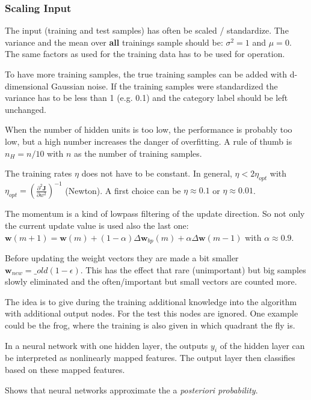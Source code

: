   \subsubsection{Scaling Input}
  The input (training and test samples) has often be scaled / standardize. The variance and the mean over \textbf{all} trainings sample should be: 
  $\sigma^2=1$ and $\mu=0$. The same factors as used for the training data has to be used for operation.
  
  
 
 To have more training samples, the true training samples can be added with d-dimensional Gaussian noise.
 If the training samples were standardized the variance has to be less than 1 (e.g. 0.1) and the category label should be left unchanged.
 
 When the number of hidden units is too low, the performance is probably too low, but a high number 
 increases the danger of overfitting. A rule of thumb is $n_H = n/10$ with $n$ as the number of training samples.
 
 The training rates $\eta$ does not have to be constant. In general,  $\eta < 2\eta_{opt}$ with $\eta_{opt}= \left( \frac{\partial^2\bm J}{\partial w^2} \right)^{-1}$ (Newton). 
 A first choice can be $\eta \approx 0.1$ or $\eta \approx 0.01$.
 
 The momentum is a kind of lowpass filtering of the update direction. So not only the current update value is used also the last one:\\
 $\bm w(m+1)= \bm w(m) +(1-\alpha) \Delta\bm w_{bp}(m) + \alpha \Delta \bm w(m-1)$ with $\alpha \approx 0.9$.
 
 Before updating the weight vectors they are made a bit smaller $\bm w_{new}= \bm _{old}(1-\epsilon)$. 
 This has the effect that rare (unimportant) but big samples slowly eliminated and the often/important but small vectors are counted more.
 
 The idea is to give during the training additional knowledge into the algorithm with additional output nodes. For the test this nodes are ignored. 
 One example could be the frog, where the training is also given in which quadrant the fly is.
 

  In a neural network with one hidden layer, the outputs $y_i$ of the hidden layer can be interpreted as nonlinearly mapped features.
  The output layer then classifies based on these mapped features. 

 Shows that neural networks approximate the a \emph{posteriori probability}.
 
